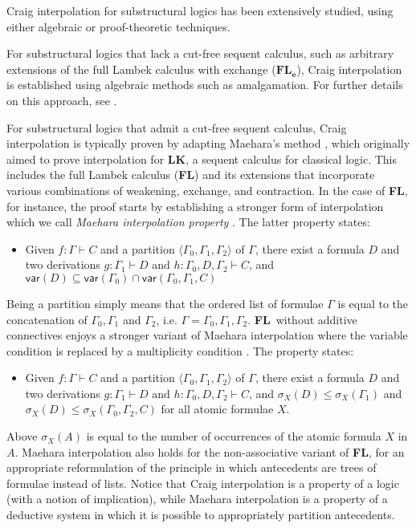 \documentclass[sn-mathphys-num]{sn-jnl}%
\newcommand{\GG}{\Gamma}
\newcommand{\mf}[1]{\mathsf{#1}}
\newcommand{\gs}[1]{\sigma_{X} (#1)}
\newcommand{\vars}[1]{\mf{var} (#1)}
\newcommand{\FL}{\textbf{FL}}
\theoremstyle{thmstyleone}%
\theoremstyle{thmstyletwo}%
\theoremstyle{thmstylethree}%
\begin{document}
Craig interpolation for substructural logics has been extensively studied, using either algebraic or proof-theoretic techniques. 

For substructural logics that lack a cut-free sequent calculus, such as arbitrary extensions of the full Lambek calculus with exchange ($\FL_{\textbf{e}}$), Craig interpolation is established using algebraic methods such as amalgamation.
For further details on this approach, see \cite{Kihara2009}.

For substructural logics that admit a cut-free sequent calculus, Craig interpolation is typically proven by adapting Maehara's method \cite{maehara1961}, which originally aimed to prove interpolation for $\mathbf{LK}$, a sequent calculus for classical logic.
This includes the full Lambek calculus (\FL) and its extensions that incorporate various combinations of weakening, exchange, and contraction.
In the case of \FL, for instance, the proof starts by establishing a stronger form of interpolation which we call \emph{Maehara interpolation property} \cite{ono:proof:nonclassical:1998}. 
The latter property states:
\begin{itemize}
  \item[\ ] Given $f : \Gamma \vdash C$ and a partition $\langle \Gamma_0, \Gamma_1, \Gamma_2 \rangle$ of $\Gamma$, there exist a formula $D$ and two derivations $g : \Gamma_1 \vdash D$ and $h : \Gamma_0, D, \Gamma_2 \vdash C$, and $\vars{D} \subseteq \vars{\Gamma_0} \cap \vars{\Gamma_0, \Gamma_1, C}$
\end{itemize}
Being a partition simply means that the ordered list of formulae $\Gamma$ is equal to the concatenation of $\Gamma_0, \Gamma_1$ and $\Gamma_2$, i.e. $\Gamma = \Gamma_0, \Gamma_1, \Gamma_2$. 
\FL~without additive connectives enjoys a stronger variant of Maehara interpolation where the variable condition is replaced by a  multiplicity condition \cite{roorda1991,moot:categorial:2012}.
The property states:
\begin{itemize}
  \item[\ ] Given $f : \Gamma \vdash C$ and a partition $\langle \Gamma_0, \Gamma_1, \Gamma_2 \rangle$ of $\Gamma$, there exist a formula $D$ and two derivations $g : \Gamma_1 \vdash D$ and $h : \Gamma_0, D, \Gamma_2 \vdash C$, and $\gs{D} \leq \gs{\GG_1}$ and $\gs{D} \leq \gs{\GG_0, \GG_2 , C}$ for all atomic formulae $X$.
\end{itemize}
Above $\gs{A}$ is equal to the number of occurrences of the atomic formula $X$ in $A$.
Maehara interpolation also holds for the non-associative variant of \FL, for an appropriate reformulation of the principle in which antecedents are trees of formulae instead of lists.
Notice that Craig interpolation is a property of a logic (with a notion of implication), while Maehara interpolation is a property of a deductive system in which it is possible to appropriately partition antecedents.
\end{document}
